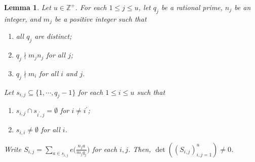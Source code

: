 \documentclass[11pt]{amsart}
\newtheorem{lemma}[theorem]{Lemma}
\theoremstyle{remark}
\newcommand{\pos}{\mathbb{Z}^+}
\begin{document}
\begin{lemma}
\label{nonzerodet}
Let $u\in\pos$. For each $1\leq j\leq u$, let $q_j$ be a rational prime, $n_j$ be an integer, and $m_j$ be a positive integer such that
\begin{enumerate}[label=\rm{(A\arabic*)}]
    \item all $q_j$ are distinct;
    \item $q_j\nmid m_jn_j$ for all $j$;
    \item $q_j\nmid m_i$ for all $i$ and $j$.
\end{enumerate}
Let $s_{i,j}\subseteq\{1,\cdots,q_j-1\}$ for each $1\leq i\leq u$ such that
\begin{enumerate}[label=\rm{(B\arabic*)}]
    \item $s_{i,j}\cap s_{i^\prime,j}=\emptyset$ for $i\neq i^\prime$;
    \item $s_{i,i}\neq\emptyset$ for all $i$.
\end{enumerate}
Write $S_{i,j}=\sum_{a\in s_{i,j}}e\big(\tfrac{n_ja}{m_jq_j}\big)$ for each $i,j$. Then, $\det((S_{i,j})_{i,j=1}^u)\neq 0$.
\end{lemma}
\end{document}
